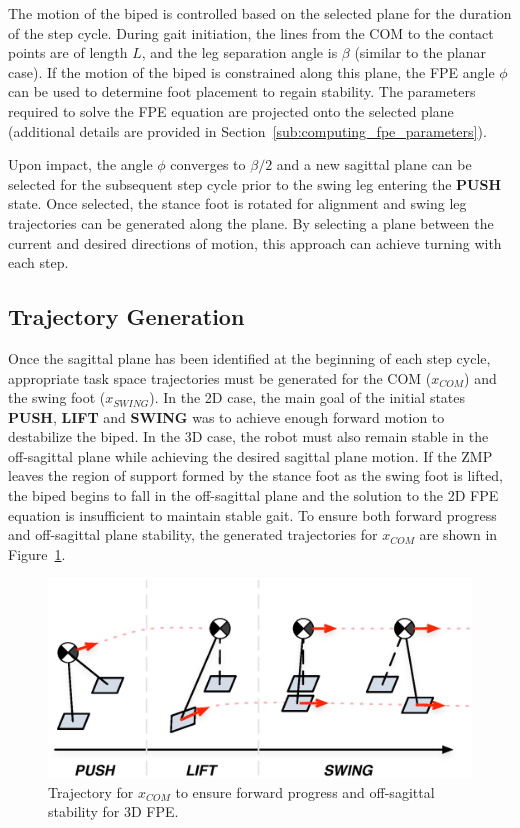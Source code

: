 The motion of the biped is controlled based on the selected plane for the duration of the step cycle. During gait initiation, the lines from the COM to the contact points are of length $L$, and the leg separation angle is $\beta$ (similar to the planar case). If the motion of the biped is constrained along this plane, the FPE angle $\phi$ can be used to determine foot placement to regain stability. The parameters required to solve the FPE equation are projected onto the selected plane (additional details are provided in Section~\ref{sub:computing_fpe_parameters}).

Upon impact, the angle $\phi$ converges to $\beta/2$ and a new sagittal plane can be selected for the subsequent step cycle prior to the swing leg entering the \textbf{PUSH} state. Once selected, the stance foot is rotated for alignment and swing leg trajectories can be generated along the plane. By selecting a plane between the current and desired directions of motion, this approach can achieve turning with each step.


\subsection{Trajectory Generation} %
\label{sub:trajectory_generation}
Once the sagittal plane has been identified at the beginning of each step cycle, appropriate task space trajectories must be generated for the COM ($x_{COM}$) and the swing foot ($x_{SWING}$). In the 2D case, the main goal of the initial states \textbf{PUSH}, \textbf{LIFT} and \textbf{SWING} was to achieve enough forward motion to destabilize the biped. In the 3D case, the robot must also remain stable in the off-sagittal plane while achieving the desired sagittal plane motion. If the ZMP leaves the region of support formed by the stance foot as the swing foot is lifted, the biped begins to fall in the off-sagittal plane and the solution to the 2D FPE equation is insufficient to maintain stable gait. To ensure both forward progress and off-sagittal plane stability, the generated trajectories for $x_{COM}$ are shown in Figure~\ref{fig:comtraj3d}. \\

\begin{figure}[!h]
	\centering
    \includegraphics[scale=0.8]{fig/fpe/comtraj3d.eps} 
  	\caption{Trajectory for $x_{COM}$ to ensure forward progress and off-sagittal stability for 3D FPE.}
	\label{fig:comtraj3d}
\end{figure}

